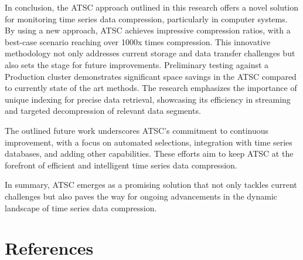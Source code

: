 \documentclass[conference]{IEEEtran}
\begin{document}
In conclusion, the ATSC approach outlined in this research offers a novel solution for monitoring time series data compression, particularly in computer systems. By using a new approach, ATSC achieves impressive compression ratios, with a best-case scenario reaching over 1000x times compression. This innovative methodology not only addresses current storage and data transfer challenges but also sets the stage for future improvements.
\vspace{5pt}
Preliminary testing against a Production cluster demonstrates significant space savings in the ATSC compared to currently state of the art methods. The research emphasizes the importance of unique indexing for precise data retrieval, showcasing its efficiency in streaming and targeted decompression of relevant data segments.

The outlined future work underscores ATSC's commitment to continuous improvement, with a focus on automated selections, integration with time series databases, and adding other capabilities. These efforts aim to keep ATSC at the forefront of efficient and intelligent time series data compression.

In summary, ATSC emerges as a promising solution that not only tackles current challenges but also paves the way for ongoing advancements in the dynamic landscape of time series data compression.

\section{References}
\end{document}
